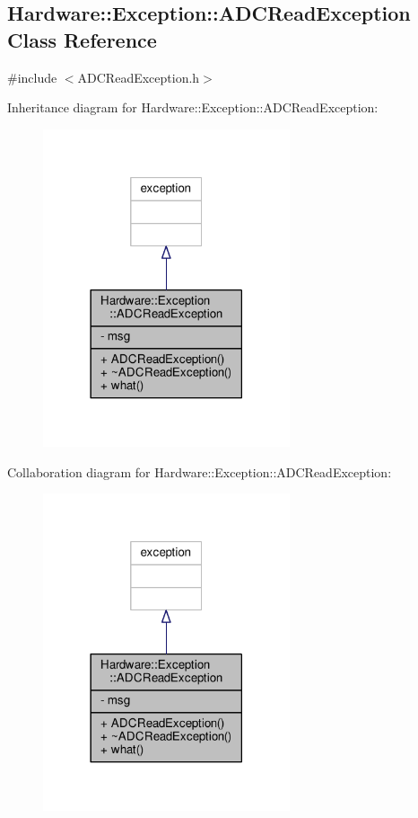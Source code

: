 \hypertarget{class_hardware_1_1_exception_1_1_a_d_c_read_exception}{}\subsection{Hardware\+:\+:Exception\+:\+:A\+D\+C\+Read\+Exception Class Reference}
\label{class_hardware_1_1_exception_1_1_a_d_c_read_exception}


{\ttfamily \#include $<$A\+D\+C\+Read\+Exception.\+h$>$}



Inheritance diagram for Hardware\+:\+:Exception\+:\+:A\+D\+C\+Read\+Exception\+:
\nopagebreak
\begin{figure}[H]
\begin{center}
\leavevmode
\includegraphics[width=206pt]{class_hardware_1_1_exception_1_1_a_d_c_read_exception__inherit__graph}
\end{center}
\end{figure}


Collaboration diagram for Hardware\+:\+:Exception\+:\+:A\+D\+C\+Read\+Exception\+:
\nopagebreak
\begin{figure}[H]
\begin{center}
\leavevmode
\includegraphics[width=206pt]{class_hardware_1_1_exception_1_1_a_d_c_read_exception__coll__graph}
\end{center}
\end{figure}
